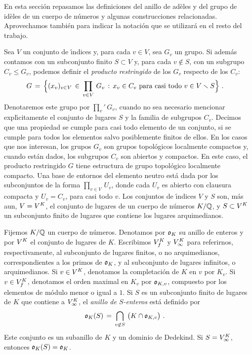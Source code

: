 En esta secci\'{o}n repasamos las definiciones del anillo de ad\`{e}les y del
grupo de id\`{e}les de un cuerpo de n\'{u}meros y algunas construcciones
relacionadas. Aprovechamos tambi\'{e}n para indicar la notaci\'{o}n que se
utilizar\'{a} en el resto del trabajo.

Sea $V$ un conjunto de \'{\i}ndices y, para cada $v\in V$, sea $G_{v}$ un
grupo. Si adem\'{a}s contamos con un subconjunto finito $S\subset V$ y, para
cada $v\not\in S$, con un subgrupo $C_{v}\leq G_{v}$, podemos definir el
\emph{producto restringido} de los $G_{v}$ respecto de los $C_{v}$:
\begin{align*}
	G & \,=\, \Big\{ (x_{v})_{v\in V}\,\in\,\prod_{v\in V}\,G_{v}\,:\,
		x_{v}\in C_{v}\text{ para casi todo }v\in V\setmin S\Big\}
	\text{ .}
\end{align*}
%
Denotaremos este grupo por $\prod_{v}'\,G_{v}$, cuando no sea necesario
mencionar expl\'{\i}citamente el conjunto de lugares $S$ y la familia de
subgrupos $C_v$.
Decimos que una propiedad se cumple para casi todo elemento de un conjunto, si
se cumple para todos los elementos salvo posiblemente finitos de ellos. En los
casos que nos interesan, los grupos $G_{v}$ son grupos topol\'{o}gicos
localmente compactos y, cuando est\'{a}n dados, los subgrupos $C_{v}$ son
abiertos y compactos. En este caso, el producto restringido $G$ tiene
estructura de grupo topol\'{o}gico localmente compacto. Una base de entornos
del elemento neutro est\'{a} dada por los subconjuntos de la forma
$\prod_{v\in V}\,U_{v}$, donde cada $U_{v}$ es abierto con clausura compacta y
$U_{v}=C_{v}$, para casi todo $v$. Los conjuntos de \'{\i}ndices $V$ y $S$ son,
m\'{a}s aun, $V=\lugares{K}$, el conjunto de lugares de un cuerpo de
n\'{u}meros $K/\bb{Q}$, y $S\subset\lugares{K}$ un subconjunto finito de
lugares que contiene los lugares arquimedianos.

Fijemos $K/\bb{Q}$ un cuerpo de n\'{u}meros. Denotamos por $\oka{K}$ su anillo
de enteros y por $\lugares{K}$ el conjunto de lugares de $K$. Escribimos
$\lugares[f]{K}$ y $\lugares[\infty]{K}$ para referirnos, respectivamente, al
subconjunto de lugares finitos, o no arquimedianos, correspondientes a los
primos de $\oka{K}$, y al subconjunto de lugares infinitos, o arquimedianos. Si
$v\in\lugares{K}$, denotamos la completaci\'{o}n de $K$ en $v$ por $K_{v}$. Si
$v\in\lugares[f]{K}$, denotamos el orden maximal en $K_{v}$ por $\oka{K,v}$,
compuesto por los elementos de m\'{o}dulo menor o igual a $1$. Si $S$ es un
subconjunto finito de lugares de $K$ que contiene a $\lugares[\infty]{K}$, el
\emph{anillo de $S$-enteros} est\'{a} definido por
\begin{align*}
	\oka{K}(S) & \,=\, \bigcap_{v\not\in S}\,\big(K\cap\oka{K,v}\big)
	\text{ .}
\end{align*}
%
Este conjunto es un subanillo de $K$ y un dominio de Dedekind. Si
$S=\lugares[\infty]{K}$, entonces $\oka{K}(S)=\oka{K}$.

